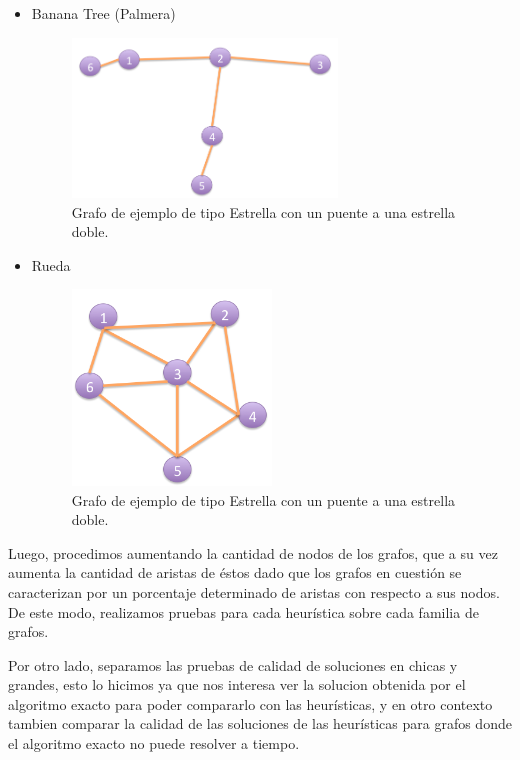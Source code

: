 \begin{itemize}
\item Banana Tree (Palmera)
 \begin{figure}[H] %
\begin{center}
\includegraphics[width=200pt]{../imgs/banana.jpg}
\caption{Grafo de ejemplo de tipo Estrella con un puente a una estrella doble.}
\end{center}
\end{figure}
\item Rueda
 \begin{figure}[H] %
\begin{center}
\includegraphics[width=150pt]{../imgs/rueda.jpg}
\caption{Grafo de ejemplo de tipo Estrella con un puente a una estrella doble.}
\end{center}
\end{figure}
\end{itemize}
Luego, procedimos aumentando la cantidad de nodos de los grafos, que a su vez aumenta la cantidad de aristas de éstos dado que los grafos en cuestión se caracterizan por un porcentaje determinado de aristas con respecto a sus nodos. De este modo, realizamos pruebas para cada heurística sobre cada familia de grafos.

Por otro lado, separamos las pruebas de calidad de soluciones en chicas y grandes, esto lo hicimos ya que nos interesa ver la solucion obtenida por el algoritmo exacto para poder compararlo con las heurísticas, y en otro contexto tambien comparar la calidad de las soluciones de las heurísticas para grafos donde el algoritmo exacto no puede resolver a tiempo. 

